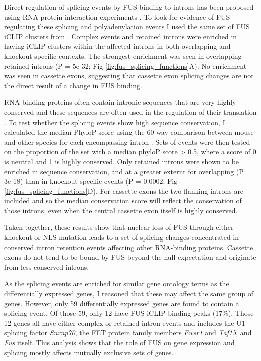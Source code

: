 Direct regulation of splicing events by FUS binding to introns has been proposed using RNA-protein interaction experiments \citep{Lagier-Tourenne2012,Rogelj2012, Ishigaki2012}.
To look for evidence of FUS regulating these splicing and polyadenylation events I used the same set of FUS iCLIP clusters from \citep{Rogelj2012}.
Complex events and retained introns were enriched in having iCLIP clusters within the affected introns in both overlapping and knockout-specific contexts.
The strongest enrichment was seen in overlapping retained introns (P = 5e-32; Fig \ref{fig:fus_splicing_functions}A). 
No enrichment was seen in cassette exons, suggesting that cassette exon splicing changes are not the direct result of a change in FUS binding.

RNA-binding proteins often contain intronic sequences that are very highly conserved \citep{Lareau2007} and these sequences are often used in the regulation of their translation \citep{Ni2007}.
To test whether the splicing events show high sequence conservation, I calculated the median PhyloP score using the 60-way comparison between mouse and other species for each encompassing intron \citep{Pollard2010-fj}.
Sets of events were then tested on the proportion of the set with a median phyloP score > 0.5, where a score of 0 is neutral and 1 is highly conserved.
Only retained introns were shown to be enriched in sequence conservation, and  at a greater externt for overlapping (P = 3e-18) than in knockout-specific events (P = 0.0002; Fig \ref{fig:fus_splicing_functions}D). 
For cassette exons the two flanking introns are included and so the median conservation score will reflect the conservation of those introns, even when the central cassette exon itself is highly conserved.

Taken together, these results show that nuclear loss of FUS through either knockout or NLS mutation leads to a set of splicing changes concentrated in conserved intron retention events affecting other RNA-binding proteins.
 Cassette exons do not tend to be bound by FUS beyond the null expectation and originate from less conserved introns.

As the splicing events are enriched for similar gene ontology terms as the differentially expressed genes, I reasoned that these may affect the same group of genes.
However, only 59 differentially expressed genes are found to contain a splicing event. 
Of those 59, only 12 have FUS iCLIP binding peaks (17\%).
Those 12 genes all have either complex or retained intron events and includes the U1 splicing factor \textit{Snrnp70}, the FET protein family members \textit{Ewsr1} and \textit{Taf15}, and \textit{Fus} itself. 
This analysis shows that the role of FUS on gene expression and splicing mostly affects mutually exclusive sets of genes.


